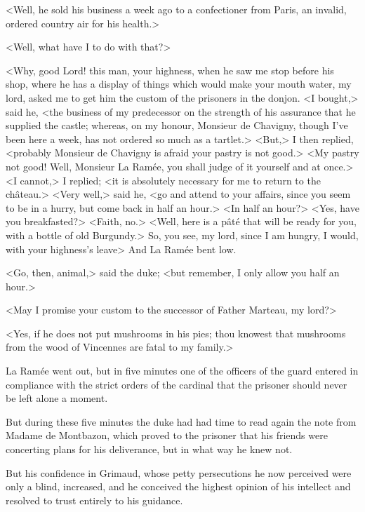 <Well, he sold his business a week ago to a confectioner from Paris, an invalid, ordered country air for his health.>

<Well, what have I to do with that?>

<Why, good Lord! this man, your highness, when he saw me stop before his shop, where he has a display of things which would make your mouth water, my lord, asked me to get him the custom of the prisoners in the donjon. <I bought,> said he, <the business of my predecessor on the strength of his assurance that he supplied the castle; whereas, on my honour, Monsieur de Chavigny, though I've been here a week, has not ordered so much as a tartlet.> <But,> I then replied, <probably Monsieur de Chavigny is afraid your pastry is not good.> <My pastry not good! Well, Monsieur La Ramée, you shall judge of it yourself and at once.> <I cannot,> I replied; <it is absolutely necessary for me to return to the château.> <Very well,> said he, <go and attend to your affairs, since you seem to be in a hurry, but come back in half an hour.> <In half an hour?> <Yes, have you breakfasted?> <Faith, no.> <Well, here is a pâté that will be ready for you, with a bottle of old Burgundy.> So, you see, my lord, since I am hungry, I would, with your highness's leave\longdash> And La Ramée bent low.

<Go, then, animal,> said the duke; <but remember, I only allow you half an hour.>

<May I promise your custom to the successor of Father Marteau, my lord?>

<Yes, if he does not put mushrooms in his pies; thou knowest that mushrooms from the wood of Vincennes are fatal to my family.>

La Ramée went out, but in five minutes one of the officers of the guard entered in compliance with the strict orders of the cardinal that the prisoner should never be left alone a moment.

But during these five minutes the duke had had time to read again the note from Madame de Montbazon, which proved to the prisoner that his friends were concerting plans for his deliverance, but in what way he knew not.

But his confidence in Grimaud, whose petty persecutions he now perceived were only a blind, increased, and he conceived the highest opinion of his intellect and resolved to trust entirely to his guidance. 